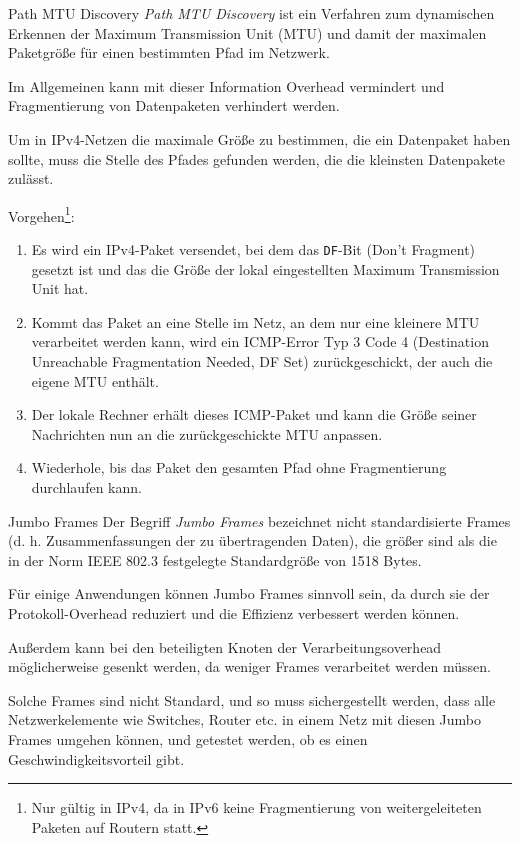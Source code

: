 \begin{defi}{Path MTU Discovery}
    \emph{Path MTU Discovery} ist ein Verfahren zum dynamischen Erkennen der Maximum Transmission Unit (MTU) und damit der maximalen Paketgröße für einen bestimmten Pfad im Netzwerk.

    Im Allgemeinen kann mit dieser Information Overhead vermindert und Fragmentierung von Datenpaketen verhindert werden.

    Um in IPv4-Netzen die maximale Größe zu bestimmen, die ein Datenpaket haben sollte, muss die Stelle des Pfades gefunden werden, die die kleinsten Datenpakete zulässt.

    Vorgehen\footnote{Nur gültig in IPv4, da in IPv6 keine Fragmentierung von weitergeleiteten Paketen auf Routern statt.}:
    \begin{enumerate}
        \item Es wird ein IPv4-Paket versendet, bei dem das \texttt{DF}-Bit (Don't Fragment) gesetzt ist und das die Größe der lokal eingestellten Maximum Transmission Unit hat.
        \item Kommt das Paket an eine Stelle im Netz, an dem nur eine kleinere MTU verarbeitet werden kann, wird ein ICMP-Error Typ 3 Code 4 (Destination Unreachable Fragmentation Needed, DF Set) zurückgeschickt, der auch die eigene MTU enthält.
        \item Der lokale Rechner erhält dieses ICMP-Paket und kann die Größe seiner Nachrichten nun an die zurückgeschickte MTU anpassen.
        \item Wiederhole, bis das Paket den gesamten Pfad ohne Fragmentierung durchlaufen kann.
    \end{enumerate}
\end{defi}

\begin{bonus}{Jumbo Frames}
    Der Begriff \emph{Jumbo Frames} bezeichnet nicht standardisierte Frames (d. h. Zusammenfassungen der zu übertragenden Daten), die größer sind als die in der Norm IEEE 802.3 festgelegte Standardgröße von 1518 Bytes.

    Für einige Anwendungen können Jumbo Frames sinnvoll sein, da durch sie der Protokoll-Overhead reduziert und die Effizienz verbessert werden können.

    Außerdem kann bei den beteiligten Knoten der Verarbeitungsoverhead möglicherweise gesenkt werden, da weniger Frames verarbeitet werden müssen.

    Solche Frames sind nicht Standard, und so muss sichergestellt werden, dass alle Netzwerkelemente wie Switches, Router etc. in einem Netz mit diesen Jumbo Frames umgehen können, und getestet werden, ob es einen Geschwindigkeitsvorteil gibt.
\end{bonus}

